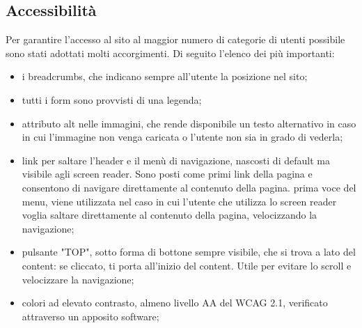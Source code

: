     \subsection{Accessibilità}
    Per garantire l'accesso al sito al maggior numero di categorie di utenti possibile sono stati adottati molti accorgimenti.
    Di seguito l'elenco dei più importanti:
    \begin{itemize}
        \item i breadcrumbs, che indicano sempre all'utente la posizione nel sito;
        \item tutti i form sono provvisti di una legenda;
        \item attributo alt nelle immagini, che rende disponibile un testo alternativo in caso in cui l’immagine non venga caricata o l'utente non sia in grado di vederla;
        \item link per saltare l'header e il menù di navigazione, nascosti di default ma visibile agli screen reader. Sono posti come primi link della pagina e consentono di navigare direttamente al contenuto della pagina. prima voce del menu, viene utilizzata nel caso in cui l’utente che utilizza lo screen reader voglia saltare direttamente al contenuto della pagina, velocizzando la navigazione;
        \item pulsante "TOP", sotto forma di bottone sempre visibile, che si trova a lato del content: se cliccato, ti porta all’inizio del content. Utile per evitare lo scroll e velocizzare la navigazione;
        \item colori ad elevato contrasto, almeno livello AA del WCAG 2.1, verificato attraverso un apposito software;
    \end{itemize}
\pagebreak